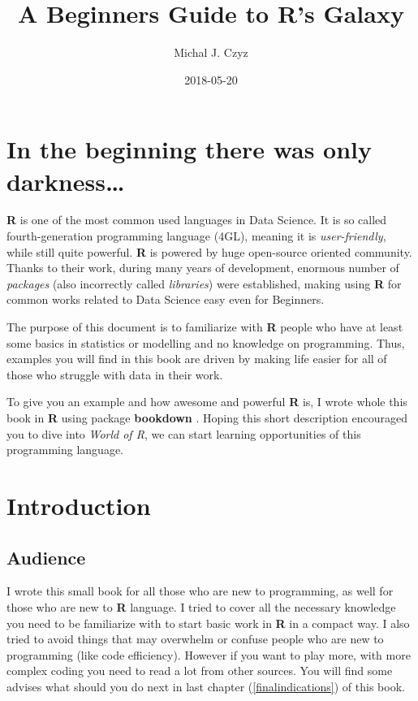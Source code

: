 \documentclass[]{book}
\title{A Beginners Guide to R's Galaxy}
\author{Michal J. Czyz}
\date{2018-05-20}
\theoremstyle{definition}
\theoremstyle{definition}
\theoremstyle{definition}
\theoremstyle{remark}
\begin{document}
\maketitle

{
\hypersetup{linkcolor=black}
\setcounter{tocdepth}{1}
\tableofcontents
}
\chapter{In the beginning there was only
darkness\ldots{}}\label{in-the-beginning-there-was-only-darkness}

\textbf{R} \citep{rcore2017} is one of the most common used languages in
Data Science. It is so called fourth-generation programming language
(4GL), meaning it is \emph{user-friendly}, while still quite powerful.
\textbf{R} is powered by huge open-source oriented community. Thanks to
their work, during many years of development, enormous number of
\emph{packages} (also incorrectly called \emph{libraries}) were
established, making using \textbf{R} for common works related to Data
Science easy even for Beginners.

The purpose of this document is to familiarize with \textbf{R} people
who have at least some basics in statistics or modelling and no
knowledge on programming. Thus, examples you will find in this book are
driven by making life easier for all of those who struggle with data in
their work.

To give you an example and how awesome and powerful \textbf{R} is, I
wrote whole this book in \textbf{R} using package \textbf{bookdown}
\citep{xie2016, R-bookdown}. Hoping this short description encouraged
you to dive into \emph{World of R}, we can start learning opportunities
of this programming language.

\chapter{Introduction}\label{intro}

\section{Audience}\label{audience}

I wrote this small book for all those who are new to programming, as
well for those who are new to \textbf{R} language. I tried to cover all
the necessary knowledge you need to be familiarize with to start basic
work in \textbf{R} in a compact way. I also tried to avoid things that
may overwhelm or confuse people who are new to programming (like code
efficiency). However if you want to play more, with more complex coding
you need to read a lot from other sources. You will find some advises
what should you do next in last chapter (\ref{finalindications}) of this
book.
\end{document}
